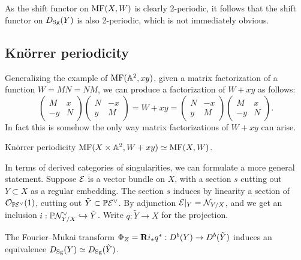 \begin{remark}{}{}
    As the shift functor on $\mathrm{MF}(X,W)$ is clearly 2-periodic, it follows that
    the shift functor on $D_{\mathrm{Sg}}(Y)$ is also 2-periodic, which is not immediately
    obvious.
\end{remark}

\subsection{Kn\"orrer periodicity}

Generalizing the example of $\mathrm{MF}(\mathbb{A}^2,xy)$, given a matrix factorization of a
function $W=MN=NM$, we can produce a factorization of $W+xy$ as follows:
\begin{equation*}
    \begin{pmatrix}
        M & x \\ -y & N
    \end{pmatrix}\begin{pmatrix}
        N & -x \\ y & M
    \end{pmatrix}
        = W+xy =
    \begin{pmatrix}
        N & -x \\ y & M
    \end{pmatrix}\begin{pmatrix}
        M & x \\ -y & N
    \end{pmatrix}.
\end{equation*}
In fact this is somehow the only way matrix factorizations of $W+xy$ can arise.

\begin{theorem}{Kn\"orrer periodicity}{}
    $\mathrm{MF}(X\times\mathbb{A}^2,W+xy)\simeq\mathrm{MF}(X,W)$.
\end{theorem}

In terms of derived categories of singularities, we can formulate a more general
statement. Suppose $\mathcal{E}$ is a vector bundle on $X$, with a section $s$ cutting
out $Y\subset X$ as a regular embedding. The section $s$ induces by linearity a
section of $\mathcal{O}_{\mathbb{P}\mathcal{E}^\vee}(1)$, cutting out $\tilde Y\subset\mathbb{P}\mathcal{E}^\vee$. By
adjunction $\mathcal{E}|_Y=\mathcal{N}_{Y/X}$, and we get an inclusion
$i:\mathbb{P}\mathcal{N}^\vee_{Y/X}\hookrightarrow\tilde Y$. Write $q:\tilde Y\to X$ for the
projection.

\begin{theorem}{\cite[Thm 2.1]{OrlovKnorrer}}{}
    The Fourier--Mukai transform $\Phi_Z=\mathbf{R} i_*q^*:D^b(Y)\to D^b(\tilde Y)$
    induces an equivalence $D_{\mathrm{Sg}}(Y)\simeq D_{\mathrm{Sg}}(\tilde Y)$.
\end{theorem}

